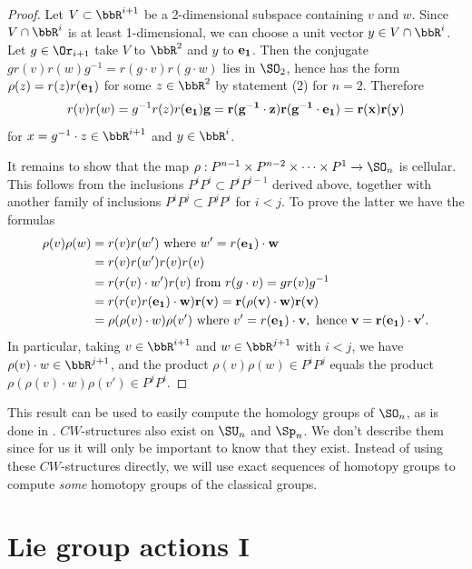 \begin{proof}
    Let $V\subset \bbR^{i+1}$ be a 2-dimensional subspace containing $v$ and $w$. Since $V\cap \bbR^i$ is at least 1-dimensional, we can choose a unit vector $y\in V\cap \bbR^i$. Let $g\in\Or_{i+1}$ take $V$ to $\bbR^2$ and $y$ to $\bf{e}_1$. Then the conjugate $gr(v)r(w)g^{-1}=r(g\cdot v)r(g\cdot w)$ lies in $\SO_2$, hence has the form $\rho(z)=r(z)r(\bf{e}_1)$ for some $z\in\bbR^2$ by statement (2) for $n=2$. Therefore
    \[r(v)r(w)=g^{-1}r(z)r(\bf{e}_1)g=r(g^{-1}\cdot z)r(g^{-1}\cdot \bf{e}_1)=r(x)r(y)\]
    for $x=g^{-1}\cdot z\in\bbR^{i+1}$ and $y\in\bbR^i$.

    It remains to show that the map $\rho:P^{n-1}\times P^{n-2}\times\cdots\times P^1\to \SO_n$ is cellular. This follows from the inclusions $P^iP^i\subset P^iP^{i-1}$ derived above, together with another family of inclusions $P^iP^j\subset P^j P^i$ for $i<j$. To prove the latter we have the formulas
    \begin{align}
        \rho(v)\rho(w)&=r(v)r(w')\text{ where }w'=r(\bf{e}_1)\cdot w \notag\\
        &=r(v)r(w')r(v)r(v)\notag\\
        &=r(r(v)\cdot w')r(v)\text{ from }r(g\cdot v)=gr(v)g^{-1}\notag\\
        &=r(r(v)r(\bf{e}_1)\cdot w)r(v)=r(\rho(v)\cdot w)r(v)\notag\\
        &=\rho(\rho(v)\cdot w)\rho(v')\text{ where }v'=r(\bf{e}_1)\cdot v,\text{ hence }v=r(\bf{e}_1)\cdot v'.
    \end{align}
    In particular, taking $v\in\bbR^{i+1}$ and $w\in\bbR^{j+1}$ with $i<j$, we have $\rho(v)\cdot w\in\bbR^{j+1}$, and the product $\rho(v)\rho(w)\in P^iP^j$ equals the product $\rho(\rho(v)\cdot w)\rho(v')\in P^jP^i$.
\end{proof}


This result can be used to easily compute the homology groups of $\SO_n$, as is done in \cite{Hatcher}. $CW$-structures also exist on $\SU_n$ and $\Sp_n$. We don't describe them since for us it will only be important to know that they exist. Instead of using these $CW$-structures directly, we will use exact sequences of homotopy groups to compute \emph{some} homotopy groups of the classical groups.





\section{Lie group actions I} \label{sec: Lie group actions}

